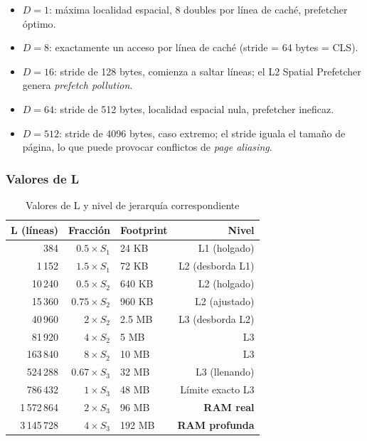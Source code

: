 \documentclass[12pt,a4paper]{article}
\begin{document}
\begin{itemize}[leftmargin=1.5em]
  \item $D=1$: máxima localidad espacial, 8 doubles por línea de caché, prefetcher óptimo.
  \item $D=8$: exactamente un acceso por línea de caché (stride = 64 bytes = CLS).
  \item $D=16$: stride de 128 bytes, comienza a saltar líneas; el L2 Spatial Prefetcher genera \emph{prefetch pollution}.
  \item $D=64$: stride de 512 bytes, localidad espacial nula, prefetcher ineficaz.
  \item $D=512$: stride de 4096 bytes, caso extremo; el stride iguala el tamaño de página, lo que puede provocar conflictos de \emph{page aliasing}.
\end{itemize}

\subsubsection*{Valores de L}

\begin{table}[H]
\centering
\caption{Valores de L y nivel de jerarquía correspondiente}
\label{tab:valoresL}
\begin{tabular}{rrlr}
\toprule
\textbf{L (líneas)} & \textbf{Fracción} & \textbf{Footprint} & \textbf{Nivel} \\
\midrule
384         & $0.5 \times S_1$    & 24 KB   & L1 (holgado) \\
1\,152      & $1.5 \times S_1$    & 72 KB   & L2 (desborda L1) \\
10\,240     & $0.5 \times S_2$    & 640 KB  & L2 (holgado) \\
15\,360     & $0.75 \times S_2$   & 960 KB  & L2 (ajustado) \\
40\,960     & $2 \times S_2$      & 2.5 MB  & L3 (desborda L2) \\
81\,920     & $4 \times S_2$      & 5 MB    & L3 \\
163\,840    & $8 \times S_2$      & 10 MB   & L3 \\
524\,288    & $0.67 \times S_3$   & 32 MB   & L3 (llenando) \\
786\,432    & $1 \times S_3$      & 48 MB   & Límite exacto L3 \\
1\,572\,864 & $2 \times S_3$      & 96 MB   & \textbf{RAM real} \\
3\,145\,728 & $4 \times S_3$      & 192 MB  & \textbf{RAM profunda} \\
\bottomrule
\end{tabular}
\end{table}
\end{document}
